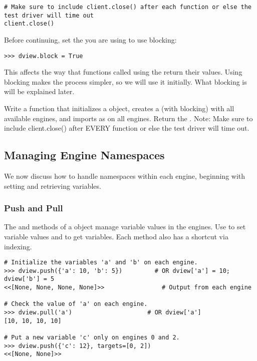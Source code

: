 \begin{lstlisting}
# Make sure to include client.close() after each function or else the test driver will time out
client.close()
\end{lstlisting}

Before continuing, set the  you are using to use blocking:
\begin{lstlisting}
>>> dview.block = True
\end{lstlisting}
This affects the way that functions called using the  return their values.
Using blocking makes the process simpler, so we will use it initially.
What blocking is will be explained later.

\begin{problem} %
Write a function that initializes a  object, creates a  (with blocking) with all available engines, and imports  as  on all engines.
Return the . Note: Make sure to include client.close() after EVERY function or else the test driver will time out.
\end{problem}


\subsection*{Managing Engine Namespaces} %
We now discuss how to handle namespaces within each engine, beginning with setting and retrieving variables.

\subsubsection*{Push and Pull} %

The  and  methods of a  object manage variable values in the engines.
Use  to set variable values and  to get variables.
Each method also has a shortcut via indexing.

\begin{lstlisting}
# Initialize the variables 'a' and 'b' on each engine.
>>> dview.push({'a': 10, 'b': 5})         # OR dview['a'] = 10; dview['b'] = 5
<<[None, None, None, None]>>                # Output from each engine

# Check the value of 'a' on each engine.
>>> dview.pull('a')                     # OR dview['a']
[10, 10, 10, 10]

# Put a new variable 'c' only on engines 0 and 2.
>>> dview.push({'c': 12}, targets=[0, 2])
<<[None, None]>>
\end{lstlisting}

